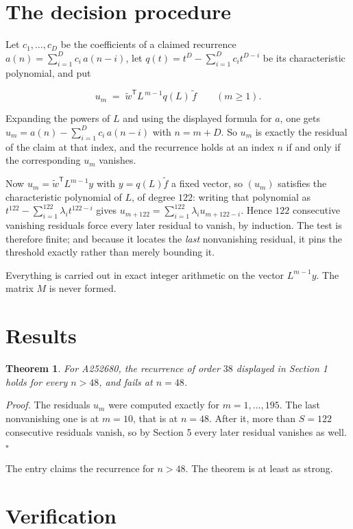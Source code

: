 \documentclass[11pt]{article}
\newtheorem{theorem}{Theorem}
\theoremstyle{definition}
\begin{document}
\section{The decision procedure}

Let $c_1,\dots,c_D$ be the coefficients of a claimed recurrence $a(n) = \sum_{i=1}^{D} c_i\,a(n-i)$, let $q(t) = t^{D} - \sum_{i=1}^{D} c_i t^{D-i}$ be its characteristic polynomial, and put

\[u_m \;=\; \tilde w^{\mathsf T} L^{\,m-1} q(L)\,\tilde f \qquad (m \ge 1).\]

Expanding the powers of $L$ and using the displayed formula for $a$, one gets $u_m = a(n) - \sum_{i=1}^{D} c_i\,a(n-i)$ with $n = m + D$. So $u_m$ is exactly the residual of the claim at that index, and the recurrence holds at an index $n$ if and only if the corresponding $u_m$ vanishes.

Now $u_m = \tilde w^{\mathsf T} L^{m-1} y$ with $y = q(L)\tilde f$ a fixed vector, so $(u_m)$ satisfies the characteristic polynomial of $L$, of degree $122$: writing that polynomial as $t^{122} - \sum_{i=1}^{122} \lambda_i t^{122-i}$ gives $u_{m+122} = \sum_{i=1}^{122} \lambda_i u_{m+122-i}$. Hence $122$ consecutive vanishing residuals force every later residual to vanish, by induction. The test is therefore finite; and because it locates the {\itshape last} nonvanishing residual, it pins the threshold exactly rather than merely bounding it.

Everything is carried out in exact integer arithmetic on the vector $L^{m-1}y$. The matrix $M$ is never formed.

\section{Results}

\begin{theorem} For A252680, the recurrence of order $38$ displayed in Section 1 holds for every $n > 48$, and fails at $n = 48$.\end{theorem}

{\itshape Proof.} The residuals $u_m$ were computed exactly for $m = 1,\dots,195$. The last nonvanishing one is at $m = 10$, that is at $n = 48$. After it, more than $S = 122$ consecutive residuals vanish, so by Section 5 every later residual vanishes as well. $\square$

The entry claims the recurrence for $n > 48$. The theorem is at least as strong.

\section{Verification}
\end{document}
